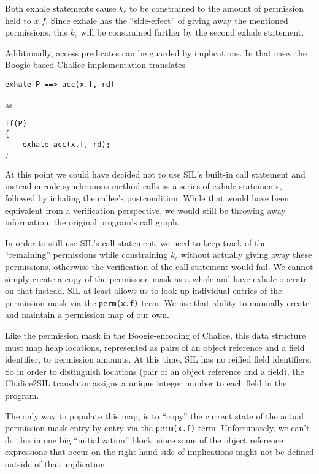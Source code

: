 Both exhale statements cause $k_c$ to be constrained to the amount of permission held to $x.f$. 
Since exhale has the “side-effect” of giving away the mentioned permissions, this $k_c$ will be constrained further by the second exhale statement.

Additionally, access predicates can be guarded by implications. 
In that case, the Boogie-based Chalice implementation translates 
\begin{lstlisting}[language=Chalice]
exhale P ==> acc(x.f, rd) 
\end{lstlisting}
as
\begin{lstlisting}[language=Chalice]
if(P) 
{ 
	exhale acc(x.f, rd);
}
\end{lstlisting}

At this point we could have decided not to use SIL's built-in call statement and instead encode synchronous method calls as a series of exhale statements, followed by inhaling the callee's postcondition. 
While that would have been equivalent from a verification perspective, we would still be throwing away information: the original program's call graph.

In order to still use SIL's call statement, we need to keep track of the “remaining” permissions while constraining $k_c$ without actually giving away these permissions, otherwise the verification of the call statement would fail. 
We cannot simply create a copy of the permission mask as a whole and have exhale operate on that instead. 
SIL at least allows us to look up individual entries of the permission mask via the \lstinline!perm(x.f)! term. 
We use that ability to manually create and maintain a permission map of our own. 

Like the permission mask in the Boogie-encoding of Chalice, this data structure must map heap locations, represented as pairs of an object reference and a field identifier, to permission amounts. 
At this time, SIL has no reified field identifiers. 
So in order to distinguish locations (pair of an object reference and a field), the Chalice2SIL translator assigns a unique integer number to each field in the program. 

The only way to populate this map, is to ``copy'' the current state of the actual permission mask entry by entry via the \lstinline!perm(x.f)! term. 
Unfortunately, we can't do this in one big ``initialization'' block, since some of the object reference expressions that occur on the right-hand-side of implications might not be defined outside of that implication. 

